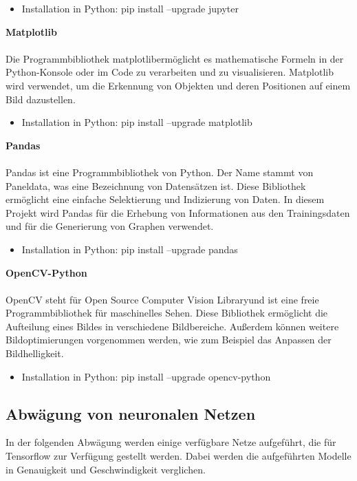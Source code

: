 \documentclass[a4paper,12pt,oneside]{article}
\begin{document}
\begin{itemize}
\item Installation in Python: pip install --upgrade jupyter
  \end{itemize}
  
\textbf{Matplotlib}\\\\
Die Programmbibliothek \glqq matplotlib\grqq ermöglicht es mathematische Formeln in der Python-Konsole oder im Code zu verarbeiten und zu visualisieren.
Matplotlib wird verwendet, um die Erkennung von Objekten und deren Positionen auf einem Bild dazustellen.

  \begin{itemize}
\item Installation in Python: pip install --upgrade matplotlib
  \end{itemize}
  
\textbf{Pandas}\\\\
Pandas ist eine Programmbibliothek von Python. Der Name stammt von \glqq Paneldata\grqq, was eine Bezeichnung von Datensätzen ist. Diese Bibliothek ermöglicht eine einfache Selektierung und Indizierung von Daten. In diesem Projekt wird Pandas für die Erhebung von Informationen aus den Trainingsdaten und für die Generierung von Graphen verwendet.

  \begin{itemize}
\item Installation in Python: pip install --upgrade pandas
  \end{itemize}
  
\textbf{OpenCV-Python}\\\\
OpenCV steht für \glqq Open Source Computer Vision Library\grqq und ist eine freie Programmbibliothek für maschinelles Sehen. Diese Bibliothek ermöglicht die Aufteilung eines Bildes in verschiedene Bildbereiche. Außerdem können weitere Bildoptimierungen vorgenommen werden, wie zum Beispiel das Anpassen der Bildhelligkeit.

  \begin{itemize}
\item Installation in Python: pip install --upgrade opencv-python
  \end{itemize}

  \subsection{Abwägung von neuronalen Netzen} 
In der folgenden Abwägung werden einige verfügbare Netze aufgeführt, die für Tensorflow zur Verfügung gestellt werden. Dabei werden die aufgeführten Modelle in Genauigkeit und Geschwindigkeit verglichen.
 
\end{document}
